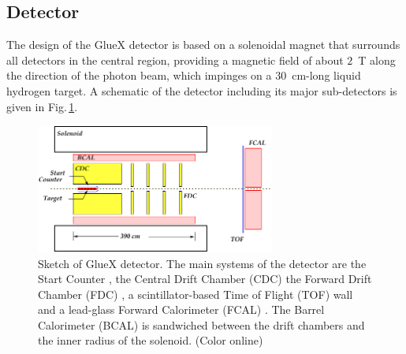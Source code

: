 \subsection[Detector]{Detector \label{sec:detector}}
The design of the GlueX detector \cite{Ghoul:2015ifw} is based on a solenoidal magnet that surrounds all detectors in the central region, providing a magnetic field of about $2$~T along the direction of the photon beam, which impinges on a 
$30$~cm-long liquid hydrogen target.  A schematic of the detector including its major sub-detectors is given in Fig.\,\ref{fig:gluexsketch}.
\begin{figure}[tbp]
\begin{center}
\includegraphics[width=0.7\textwidth]{figures/GlueX_Sketch.pdf}  
\caption{\label{fig:gluexsketch}          
  Sketch of GlueX detector.  The main systems of the detector are the Start Counter \cite{Pooser:2019rhu}, the Central Drift Chamber (CDC) \cite{VanHaarlem:2010yq} the Forward Drift Chamber (FDC) \cite{Pentchev2017281}, a scintillator-based Time of Flight (TOF) wall and a lead-glass Forward Calorimeter (FCAL) \cite{MORIYA201360}. The Barrel Calorimeter (BCAL) is sandwiched between the drift chambers and the inner radius of the solenoid.  (Color online)
}   
\end{center}  
\end{figure}

